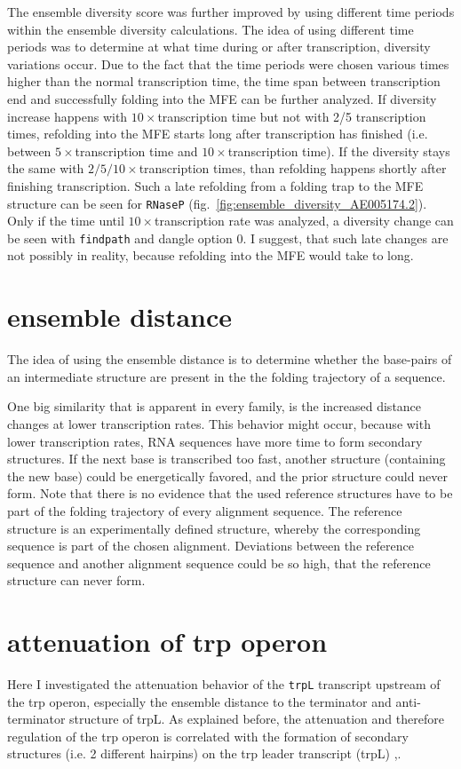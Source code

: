 \documentclass[ twoside,openright,titlepage,numbers=noenddot,headinclude,%
                footinclude=false, cleardoublepage=empty,abstractoff, %
                BCOR=5mm,paper=a4,fontsize=11pt,%
                ngerman,american,%
                ]{scrreprt}
\begin{document}
The ensemble diversity score was further improved by using different time periods within the ensemble diversity
calculations.
The idea of using different time periods was to determine at what time during or after transcription,
diversity variations occur. Due to the fact that the time periods were
chosen various times higher than the normal transcription time, the time
span between transcription end and successfully folding into the MFE can be
further analyzed.  If diversity increase happens with $10
\times$transcription time but not with 2/5 transcription times, refolding into the MFE starts long after transcription has
finished (i.e. between
$5 \times$transcription time and $10 \times$transcription time). If the
diversity stays the same with $2/5/10 \times$transcription times, than
refolding happens shortly after finishing transcription.  Such a late
refolding from a folding trap to the MFE structure can be seen for \texttt{RNaseP} (fig.~\ref{fig:ensemble_diversity_AE005174.2}). Only if the time until $10
\times$transcription rate was analyzed, a diversity change can be seen with
\texttt{findpath} and dangle option $0$. I suggest, that such late changes
are not possibly in reality, because refolding into the MFE would take to
long.


\section{ensemble distance}
The idea of using the ensemble distance is to determine whether the base-pairs of an intermediate
structure are present in the the folding trajectory of a sequence.

One big similarity that is apparent in every family, is the increased
distance changes at lower transcription rates. This behavior might occur,
because with lower transcription rates, RNA sequences have more time to
form secondary structures. If the next base is transcribed too fast,
another structure (containing the new base) could be energetically favored,
and the prior structure could never form.  
Note that there is no evidence
that the used reference structures have to be part of the folding
trajectory of every alignment sequence. The reference structure is an
experimentally defined structure, whereby the corresponding sequence is
part of the chosen alignment. Deviations between the reference sequence and
another alignment sequence could be so high, that the reference structure
can never form.

\section{attenuation of trp operon}
Here I investigated the attenuation behavior of the \texttt{trpL} transcript upstream of the trp operon, especially the ensemble distance to the terminator and anti-terminator structure of trpL.
As explained before, the attenuation and therefore regulation of the trp operon is correlated with the formation of secondary structures (i.e. 2 different hairpins) on the trp leader transcript (trpL) \cite{Yanofsky1977},\cite{Oxender1979}.
\end{document}
